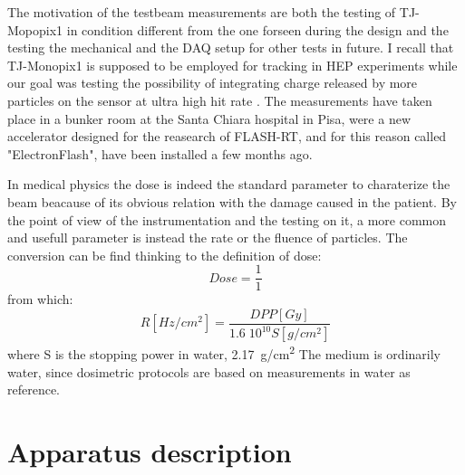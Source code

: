 The motivation of the testbeam measurements are both the testing of TJ-Mopopix1 in condition different from the one forseen during the design and the testing the mechanical and the DAQ setup for other tests in future. I recall that TJ-Monopix1 is supposed to be employed for tracking in HEP experiments while our goal was testing the possibility of integrating charge released by more particles on the sensor at ultra high hit rate .
The measurements have taken place in a bunker room at the Santa Chiara hospital in Pisa, were a new accelerator designed for the reasearch of FLASH-RT, and for this reason called "ElectronFlash", have been installed a few months ago. 

In medical physics the dose is indeed the standard parameter to charaterize the beam beacause of its obvious relation with the damage caused in the patient. By the point of view of the instrumentation and the testing on it, a more common and usefull parameter is instead the rate or the fluence of particles.  
The conversion can be find thinking to the definition of dose: 
\begin{equation}
   Dose = \frac{1}{1}
\end{equation}
from which:
\begin{equation}
   R[Hz/cm^2] = \frac{DPP[Gy]}{1.6 \;10^{10} S[g/cm^2]}
\end{equation}
where S is the stopping power in water, \SI{2.17}{g/cm\squared}
The medium is ordinarily water, since dosimetric protocols are based on measurements in water as reference.


\section{Apparatus description}
